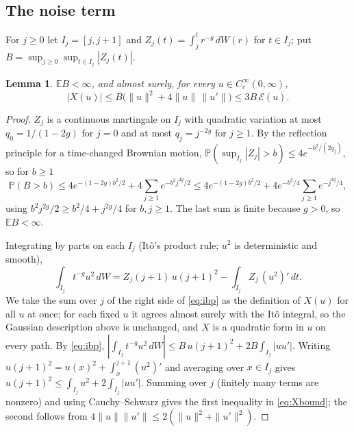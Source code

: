 \documentclass[11pt]{article}
\newtheorem{lemma}[theorem]{Lemma}
\theoremstyle{remark}
\newcommand{\E}{\mathbb{E}}
\newcommand{\Prob}{\mathbb{P}}
\begin{document}
\subsection{The noise term}

For $j\ge0$ let $I_j=[j,j+1]$ and $Z_j(t)=\int_j^t r^{-g}\,dW(r)$ for $t\in I_j$; put
$B=\sup_{j\ge0}\sup_{t\in I_j}|Z_j(t)|$.

\begin{lemma}\label{lem:B}
$\E B<\infty$, and almost surely, for every $u\in C_c^\infty(0,\infty)$,
\begin{equation}\label{eq:Xbound}
|X(u)|\le B\bigl(\|u\|^2+4\|u\|\,\|u'\|\bigr)\le 3B\,\mathcal E(u).
\end{equation}
\end{lemma}

\begin{proof}
$Z_j$ is a continuous martingale on $I_j$ with quadratic variation at most $q_0=1/(1-2g)$ for $j=0$ and at most
$q_j=j^{-2g}$ for $j\ge1$. By the reflection principle for a time-changed Brownian motion,
$\Prob(\sup_{I_j}|Z_j|>b)\le4e^{-b^2/(2q_j)}$, so for $b\ge1$
\[
\Prob(B>b)\le4e^{-(1-2g)b^2/2}+4\sum_{j\ge1}e^{-b^2j^{2g}/2}\le4e^{-(1-2g)b^2/2}+4e^{-b^2/4}\sum_{j\ge1}e^{-j^{2g}/4},
\]
using $b^2j^{2g}/2\ge b^2/4+j^{2g}/4$ for $b,j\ge1$. The last sum is finite because $g>0$, so $\E B<\infty$.

Integrating by parts on each $I_j$ (Itô's product rule; $u^2$ is deterministic and smooth),
\begin{equation}\label{eq:ibp}
\int_{I_j}t^{-g}u^2\,dW=Z_j(j+1)\,u(j+1)^2-\int_{I_j}Z_j\,(u^2)'\,dt .
\end{equation}
We take the sum over $j$ of the right side of \eqref{eq:ibp} as the definition of $X(u)$ for all $u$ at once; for
each fixed $u$ it agrees almost surely with the It\^o integral, so the Gaussian description above is unchanged, and
$X$ is a quadratic form in $u$ on every path. By \eqref{eq:ibp},
$|\int_{I_j}t^{-g}u^2\,dW|\le B\,u(j+1)^2+2B\int_{I_j}|uu'|$. Writing $u(j+1)^2=u(x)^2+\int_x^{j+1}(u^2)'$ and
averaging over $x\in I_j$ gives $u(j+1)^2\le\int_{I_j}u^2+2\int_{I_j}|uu'|$. Summing over $j$ (finitely many terms are
nonzero) and using Cauchy--Schwarz gives the first inequality in \eqref{eq:Xbound}; the second follows from
$4\|u\|\|u'\|\le2(\|u\|^2+\|u'\|^2)$.
\end{proof}
\end{document}
